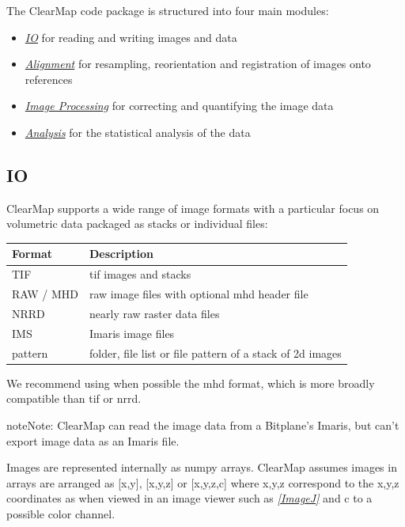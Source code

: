 \documentclass[letterpaper,10pt,english]{sphinxmanual}
\begin{document}
The ClearMap code package is structured into four main modules:
\begin{itemize}
\item {} 
{\hyperref[introduction:io]{\emph{IO}}} for reading and writing images and data

\item {} 
{\hyperref[introduction:alignment]{\emph{Alignment}}} for resampling, reorientation and registration of images onto references

\item {} 
{\hyperref[introduction:image-processing]{\emph{Image Processing}}} for correcting and quantifying the image data

\item {} 
{\hyperref[introduction:analysis]{\emph{Analysis}}} for the statistical analysis of the data

\end{itemize}


\subsection{IO}
\label{introduction:io}
ClearMap supports a wide range of image formats with a particular focus on volumetric data packaged as stacks or individual files:

\begin{tabulary}{\linewidth}{|L|L|}
\hline
\textsf{\relax 
Format
} & \textsf{\relax 
Description
}\\
\hline
TIF
 & 
tif images and stacks
\\
\hline
RAW / MHD
 & 
raw image files with optional mhd header file
\\
\hline
NRRD
 & 
nearly raw raster data files
\\
\hline
IMS
 & 
Imaris image files
\\
\hline
pattern
 & 
folder, file list or file pattern of a stack of 2d images
\\
\hline\end{tabulary}


We recommend using when possible the mhd format, which is more broadly compatible than tif or nrrd.

\begin{notice}{note}{Note:}
ClearMap can read the image data from a Bitplane’s Imaris, but can’t export image data as an Imaris file.
\end{notice}

Images are represented internally as numpy arrays. ClearMap assumes images
in arrays are arranged as {[}x,y{]}, {[}x,y,z{]} or {[}x,y,z,c{]} where x,y,z correspond to
the x,y,z coordinates as when viewed in an image viewer such as \label{introduction:id1}{\hyperref[introduction:imagej]{\emph{{[}ImageJ{]}}}} and
c to a possible color channel.
\end{document}
